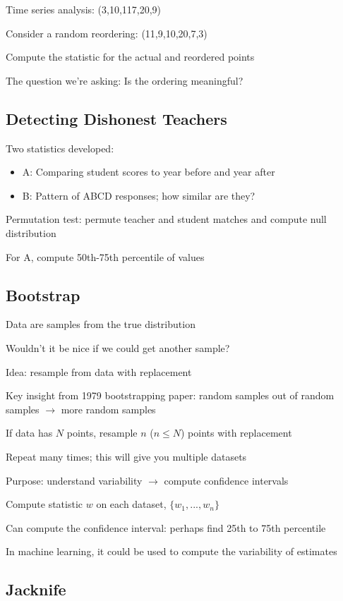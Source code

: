 \documentclass[twoside]{article}
\begin{document}
Time series analysis: (3,10,117,20,9)

Consider a random reordering: (11,9,10,20,7,3)

Compute the statistic for the actual and reordered points

The question we're asking: Is the ordering meaningful?

\subsection{Detecting Dishonest Teachers}

Two statistics developed:

\begin{itemize}
\item A: Comparing student scores to year before and year after
\item B: Pattern of ABCD responses; how similar are they?
\end{itemize}

Permutation test: permute teacher and student matches and compute null distribution

For A, compute 50th-75th percentile of values

\subsection{Bootstrap}

Data are samples from the true distribution

Wouldn't it be nice if we could get another sample?

Idea: resample from data with replacement

Key insight from 1979 bootstrapping paper: random samples out of random samples $\rightarrow$ more random samples

If data has $N$ points, resample $n$ ($n \leq N$) points with replacement

Repeat many times; this will give you multiple datasets

Purpose: understand variability $\rightarrow$ compute confidence intervals

Compute statistic $w$ on each dataset, $\{ w_1, ..., w_n \}$

Can compute the confidence interval: perhaps find 25th to 75th percentile


In machine learning, it could be used to compute the variability of estimates


\subsection{Jacknife}
\end{document}
